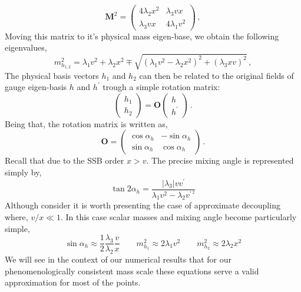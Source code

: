 %
\begin{equation}
\mathbf{M}^2 =
\begin{pmatrix}
4 \lambda_2 x^2 & \lambda_3 v x \\ 
\lambda_3 v x   & 4 \lambda_1 v^2 
\end{pmatrix}\,,
\label{eq:hess}
\end{equation}
% 
Moving this matrix to it's physical mass eigen-base, we obtain the following eigenvalues,
%
\begin{equation}
m_{h_{1,2}}^2 = \lambda_1 v^2 + \lambda_2 x^2 \mp \sqrt{(\lambda_1 v^2 - \lambda_2 x^2)^2 + (\lambda_3 x v)^2}\,,
\label{eq:eigvals}
\end{equation}
The physical basis vectors $h_1$ and $h_2$ can then be related to the original fields of gauge eigen-basis $h$ and $h^\prime$ trough a simple rotation matrix:
%
\begin{equation}
	\begin{pmatrix}
	h_1 \\
	h_2 
	\end{pmatrix}
	=
	\mathbf{O}
	\begin{pmatrix}
	h \\
	h^\prime 
	\end{pmatrix}\,.
	\label{eq:trans}
\end{equation}
%
Being that, the rotation matrix is written as, 
%
\begin{equation}
	\mathbf{O} = 
	\begin{pmatrix}
	\cos \alpha_h & -\sin \alpha_h \\
	\sin \alpha_h & \cos \alpha_h 
	\end{pmatrix}\,.
	\label{eq:rotmat}
\end{equation}
%
Recall that due to the SSB order $x > v$. The precise mixing angle is represented simply by, 
\begin{equation}
\tan 2 \alpha_h   = \frac{ \left| \lambda_3 \right|  v v^\prime }{\lambda_1 v^2 - \lambda_2 v^{\prime\,^2} } 
\end{equation} 
Although consider it is worth presenting the case of approximate decoupling where, $v/x\ll 1$. In this case scalar masses and mixing angle become particularly simple,
\begin{equation}
\sin \alpha_h \approx \dfrac{1}{2}\dfrac{\lambda_3}{\lambda_2} \dfrac{v}{x} \qquad
m_{h_1}^2 \approx 2 \lambda_1 v^2 \qquad m_{h_2}^2 \approx 2 \lambda_2 x^2
\label{eq:simplify}
\end{equation}
%
We will see in the context of our numerical results that for our phenomenologically consistent mass scale these equations serve a valid approximation for most of the  points. 

